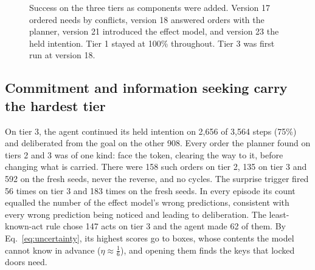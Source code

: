 \documentclass{article}
\begin{document}
\begin{figure}[t]
    \centering
    \caption{Success on the three tiers as components were added. Version 17 ordered needs by conflicts, version 18 answered orders with the planner, version 21 introduced the effect model, and version 23 the held intention. Tier 1 stayed at 100\% throughout. Tier 3 was first run at version 18.}
    \label{fig:progress}
\end{figure}

\subsection{Commitment and information seeking carry the hardest tier}

On tier 3, the agent continued its held intention on 2,656 of 3,564 steps (75\%) and deliberated from the goal on the other 908. Every order the planner found on tiers 2 and 3 was of one kind: face the token, clearing the way to it, before changing what is carried. There were 158 such orders on tier 2, 135 on tier 3 and 592 on the fresh seeds, never the reverse, and no cycles. The surprise trigger fired 56 times on tier 3 and 183 times on the fresh seeds. In every episode its count equalled the number of the effect model's wrong predictions, consistent with every wrong prediction being noticed and leading to deliberation. The least-known-act rule chose 147 acts on tier 3 and the agent made 62 of them. By Eq.~\eqref{eq:uncertainty}, its highest scores go to boxes, whose contents the model cannot know in advance ($\eta\approx\tfrac16$), and opening them finds the keys that locked doors need.
\end{document}
